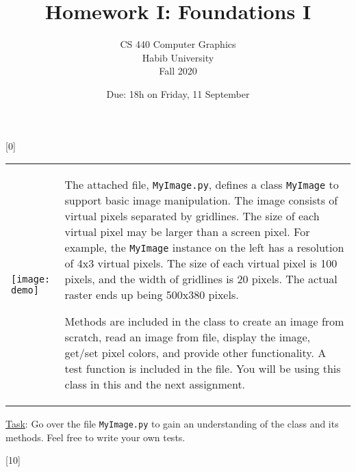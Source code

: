 \documentclass[addpoints]{exam}
\title{Homework I: Foundations I}
\author{CS 440 Computer Graphics\\Habib University\\Fall 2020}
\date{Due: 18h on Friday, 11 September}
\begin{document}
\maketitle

\begin{questions}

[0]

  \noindent\begin{tabularx}{\textwidth}{lX}
    \texttt{[image: demo]} &

    The attached file, \texttt{MyImage.py}, defines a class \texttt{MyImage} to support basic image manipulation. The image consists of virtual pixels separated by gridlines. The size of each virtual pixel may be larger than a screen pixel. For example, the \texttt{MyImage} instance on the left has a resolution of 4x3 virtual pixels. The size of each virtual pixel is 100 pixels, and the width of gridlines is 20 pixels. The actual raster ends up being 500x380 pixels.

    Methods are included in the class to create an image from scratch, read an image from file, display the image, get/set pixel colors, and provide other functionality. A test function is included in the file. You will be using this class in this and the next assignment.
  \end{tabularx}

  \underline{Task}: Go over the file \texttt{MyImage.py} to gain an understanding of the class and its methods. Feel free to write your own tests.

[10]


\end{questions}
\end{document}
